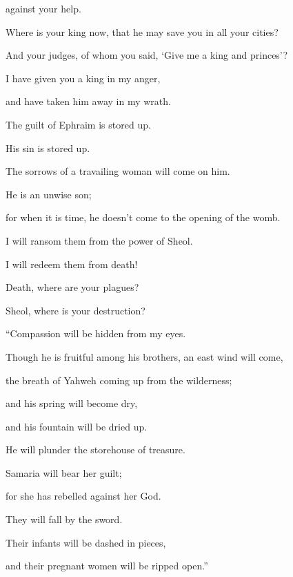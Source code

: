 {\par }{\QB against your help.
\par }{\Q {}Where is your king now, that he may save you in all your cities?
\par }{\QB And your judges, of whom you said, ‘Give me a king and princes’?
\par }{\Q {}I have given you a king in my anger,
\par }{\QB and have taken him away in my wrath.
\par }{\Q {}The guilt of Ephraim is stored up.
\par }{\QB His sin is stored up.
\par }{\Q {}The sorrows of a travailing woman will come on him.
\par }{\QB He is an unwise son;
\par }{\QB for when it is time, he doesn’t come to the opening of the womb.
\par }{\Q {}I will ransom them from the power of Sheol.
\par }{\QB I will redeem them from death!
\par }{\QB Death, where are your plagues?
\par }{\QB Sheol, where is your destruction?
\par }{\BB \par }{\Q “Compassion will be hidden from my eyes.
\par }{\QB {}Though he is fruitful among his brothers, an east wind will come,
\par }{\QB the breath of Yahweh coming up from the wilderness;
\par }{\QB and his spring will become dry,
\par }{\QB and his fountain will be dried up.
\par }{\QB He will plunder the storehouse of treasure.
\par }{\Q {}Samaria will bear her guilt;
\par }{\QB for she has rebelled against her God.
\par }{\QB They will fall by the sword.
\par }{\QB Their infants will be dashed in pieces,
\par }{\QB and their pregnant women will be ripped open.”
\par }{\BB \par }
